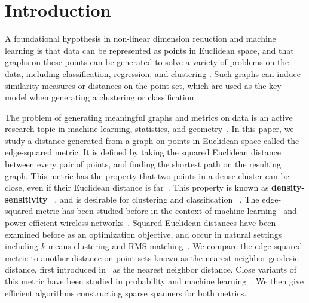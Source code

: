 \section{Introduction}

A foundational hypothesis in non-linear dimension reduction and machine
learning is that data can be represented as points in Euclidean space,
and that graphs on these points can be generated to solve a variety of
problems on the data, including classification, regression, and clustering \cite{Daitch09, Chen11,vL09, Dong11, Hashi15,
vonluxburg13density, mcqueen16megaman}.
Such graphs can induce similarity measures or distances on the point set,
which are used as the key model when generating a clustering or
classification~\cite{Daitch09, bijral11semiSupLearningDBD, tenenbaum00global}

The problem of generating meaningful graphs and metrics on data is an active research topic in machine learning, statistics, and
geometry~\cite{hein07graph, amenta99surface, sajama05estimatingDBDM, vincent03,
bijral11semiSupLearningDBD, Hashi15, alamgir12shortest, ting10analysis,
gorban07principal, bookDey2007, cavanna16adaptive, Gottlieb14, vL04,
agarwal16efficient, SridharMaster, hwang2016}.
%
In this paper, we study a distance generated from a graph
on points in Euclidean space called the edge-squared metric. It
is defined by taking the squared Euclidean distance between every pair of
points, and finding the shortest path on the resulting graph.
This metric has the property that two points
in a dense cluster can be close, even if their Euclidean
distance is far~\cite{bijral11semiSupLearningDBD}.
This property is known as \textbf{density-sensitivity}
~\cite{vincent03}, and is
desirable for clustering and classification
~\cite{sajama05estimatingDBDM, alamgir12shortest, hwang2016,
cohen15approximating}. The edge-squared metric has been studied
before in the
context of machine learning~\cite{bijral11semiSupLearningDBD, vincent03, hwang2016, alamgir12shortest,
cohen15approximating} and
power-efficient wireless
networks~\cite{LiWan2001, LiWan2002}.
Squared Euclidean distances have been
examined before as an optimization objective, and occur in
natural settings including $k$-means clustering and RMS
matching~\cite{macqueen67,Agarwal12}.
We compare the edge-squared metric to another
distance on point sets known as the nearest-neighbor geodesic distance,
first introduced in~\cite{cohen15approximating} as the nearest neighbor
distance. Close variants of this metric have been studied in
probability and machine learning~\cite{sajama05estimatingDBDM, cohen15approximating,
hwang2016}. We then give efficient algorithms constructing sparse
spanners for both metrics.

